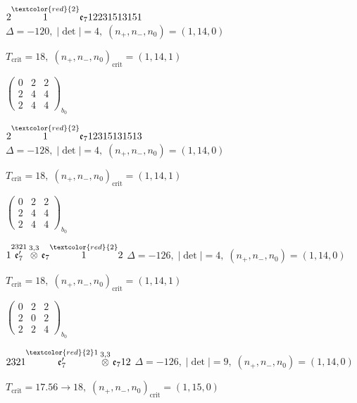 \documentclass[10pt]{article}
\begin{document}
$2\overset{\textcolor{red}{2}}{1}\mathfrak{e}_712231513151$ \quad $\Delta=-120,\; |\det|=4,\; (n_+,n_-,n_0)=(1,14,0)$

\hspace{1em}$T_{\text{crit}}=18,\; (n_+,n_-,n_0)_{\text{crit}}=(1,14,1)$

\hspace{2em}$\left(\begin{smallmatrix}0 & 2 & 2 \\ 2 & 4 & 4 \\ 2 & 4 & 4\end{smallmatrix}\right)_{\!b_0}$

\smallskip

$2\overset{\textcolor{red}{2}}{1}\mathfrak{e}_712315131513$ \quad $\Delta=-128,\; |\det|=4,\; (n_+,n_-,n_0)=(1,14,0)$

\hspace{1em}$T_{\text{crit}}=18,\; (n_+,n_-,n_0)_{\text{crit}}=(1,14,1)$

\hspace{2em}$\left(\begin{smallmatrix}0 & 2 & 2 \\ 2 & 4 & 4 \\ 2 & 4 & 4\end{smallmatrix}\right)_{\!b_0}$

\smallskip

$1\overset{2321}{\mathfrak{e}_7'}\overset{3,3}{\otimes}\mathfrak{e}_7\overset{\textcolor{red}{2}}{1}2$ \quad $\Delta=-126,\; |\det|=4,\; (n_+,n_-,n_0)=(1,14,0)$

\hspace{1em}$T_{\text{crit}}=18,\; (n_+,n_-,n_0)_{\text{crit}}=(1,14,1)$

\hspace{2em}$\left(\begin{smallmatrix}0 & 2 & 2 \\ 2 & 0 & 2 \\ 2 & 2 & 4\end{smallmatrix}\right)_{\!b_0}$

$2321\overset{\textcolor{red}{2}1}{\mathfrak{e}_7'}\overset{3,3}{\otimes}\mathfrak{e}_712$ \quad $\Delta=-126,\; |\det|=9,\; (n_+,n_-,n_0)=(1,14,0)$

\hspace{1em}$T_{\text{crit}}=17.56 \to 18,\; (n_+,n_-,n_0)_{\text{crit}}=(1,15,0)$
\end{document}
